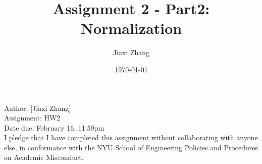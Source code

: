 \documentclass{article}
\title{Assignment 2 - Part2: Normalization}
\author{Jiaxi Zhang}
\date{\today}
\begin{document}
\maketitle
\begin{CJK*}{UTF8}{gbsn}
    \begin{flushleft}
    Author: [Jiaxi Zhang]
    \\Assignment: HW2
    \\Date due: February 16, 11:59pm
    \\I pledge that I have completed this assignment without collaborating with anyone else, in conformance with the NYU School of Engineering Policies and Procedures on Academic Misconduct.
    \end{flushleft}




\end{CJK*}
\end{document}
